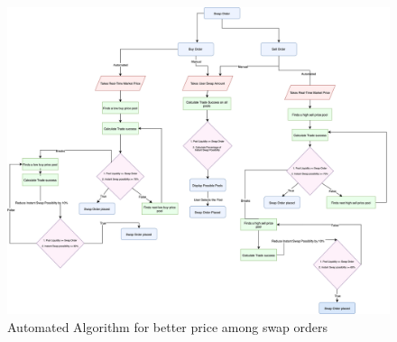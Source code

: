 \documentclass[10pt]{article}
\begin{document}
\begin{figure}
\begin{center}
\includegraphics[width=\textwidth]{dex-algorithm}
\caption{Automated Algorithm for better price among swap orders}
\end{center}
\end{figure}
\end{document}
